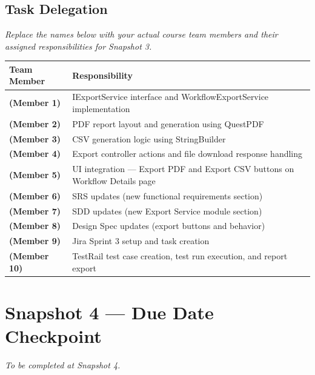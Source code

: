 \documentclass[12pt]{article}
\begin{document}
\subsection{Task Delegation}

\textit{Replace the names below with your actual course team members and their assigned
responsibilities for Snapshot 3.}

\begin{center}
\begin{tabular}{>{\bfseries}p{4cm} p{9cm}}
\toprule
Team Member & Responsibility \\
\midrule
(Member 1) & IExportService interface and WorkflowExportService implementation \\
(Member 2) & PDF report layout and generation using QuestPDF \\
(Member 3) & CSV generation logic using StringBuilder \\
(Member 4) & Export controller actions and file download response handling \\
(Member 5) & UI integration --- Export PDF and Export CSV buttons on Workflow Details page \\
(Member 6) & SRS updates (new functional requirements section) \\
(Member 7) & SDD updates (new Export Service module section) \\
(Member 8) & Design Spec updates (export buttons and behavior) \\
(Member 9) & Jira Sprint 3 setup and task creation \\
(Member 10) & TestRail test case creation, test run execution, and report export \\
\bottomrule
\end{tabular}
\end{center}

\section{Snapshot 4 — Due Date Checkpoint}

\textit{To be completed at Snapshot 4.}
\end{document}
